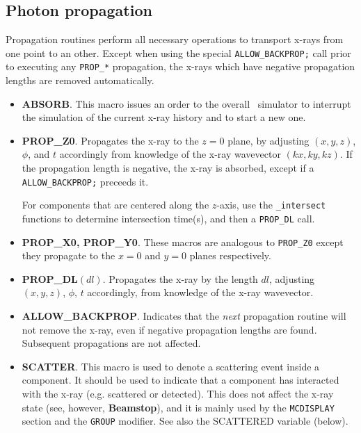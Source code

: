 \subsection{Photon propagation}
Propagation routines perform all necessary operations to transport x-rays
from one point to an other. Except when using the special
\verb+ALLOW_BACKPROP;+ call prior to executing any \verb+PROP_*+ propagation,
the x-rays which have negative propagation lengths are removed automatically.
\begin{itemize}
\item {\bfseries ABSORB}. This macro issues an order to the overall
  \MCX\ simulator to interrupt the simulation of the current x-ray
  history and to start a new one.
\item {\bfseries PROP\_Z0}. Propagates the x-ray to the $z=0$ plane,
  by adjusting $(x,y,z)$, $\phi$, and $t$ accordingly from knowledge of the
  x-ray wavevector $(kx,ky,kz)$.
  If the propagation length is negative, the x-ray is absorbed, except if a \verb+ALLOW_BACKPROP;+ preceeds it.

  For components that are centered along the $z$-axis,
  use the \verb+_intersect+ functions to determine intersection time(s),
  and then a \verb+PROP_DL+ call.
\item {\bfseries PROP\_X0, PROP\_Y0}. These macros are analogous to \verb+PROP_Z0+ except they propagate to the $x=0$ and $y=0$ planes respectively.

\item {\bfseries PROP\_DL}$(dl)$. Propagates the x-ray by the length $dl$, adjusting $(x,y,z)$, $\phi$, $t$ accordingly,
  from knowledge of the x-ray wavevector.
\item {\bfseries ALLOW\_BACKPROP}. Indicates that the \emph{next} propagation routine
  will not remove the x-ray, even if negative propagation lengths
  are found. Subsequent propagations are not affected.
\item {\bfseries SCATTER}. This macro is used to denote a scattering event
  inside a component.
  It should be used
  to indicate that a component has interacted with the x-ray
  (e.g. scattered or detected).
  This does not affect the x-ray state (see, however, {\bfseries Beamstop}),
  and it is mainly used by the \verb+MCDISPLAY+ section and the \verb+GROUP+ modifier.
  See also the SCATTERED variable (below).
    
\end{itemize}

